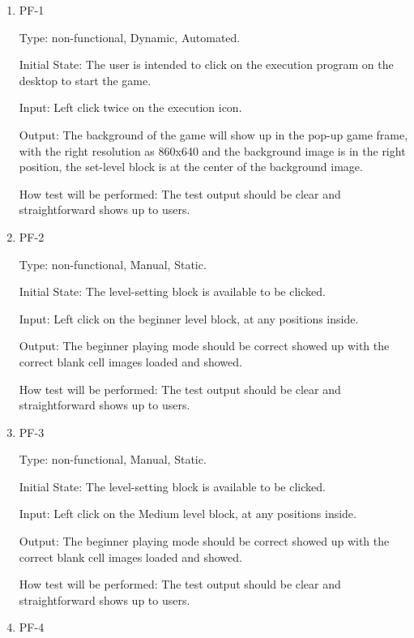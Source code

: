 \documentclass[12pt, titlepage]{article}
\begin{document}
\begin{enumerate}

\item{PF-1\\}

Type: non-functional, Dynamic, Automated.
					
Initial State: The user is intended to click on the execution program on the desktop to start the game. 
					
Input: Left click twice on the execution icon.
					
Output: The background of the game will show up in the pop-up game frame, with the right resolution as 860x640 and the background image is in the right position, the
set-level block is at the center of the background image.
					
How test will be performed: The test output should be clear and straightforward shows up to users. 
					
\item{PF-2\\}

Type: non-functional, Manual, Static.
					
Initial State: The level-setting block is available to be clicked.
					
Input: Left click on the beginner level block, at any positions inside.
					
Output: The beginner playing mode should be correct showed up with the correct blank cell images loaded and showed.
					
How test will be performed: The test output should be clear and straightforward shows up to users. 

\item{PF-3\\}

Type: non-functional, Manual, Static.
					
Initial State: The level-setting block is available to be clicked.
					
Input: Left click on the Medium level block, at any positions inside.
					
Output: The beginner playing mode should be correct showed up with the correct blank cell images loaded and showed.
					
How test will be performed: The test output should be clear and straightforward shows up to users. 

\item{PF-4\\}


\end{enumerate}
\end{document}
